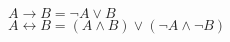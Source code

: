 \documentclass[preview]{standalone}
\begin{document}
\begin{center}
${A\rightarrow B=\neg A\vee B}$ \\ ${A\leftrightarrow B=(A\wedge B)\vee (\neg A\wedge \neg B)}$
\end{center}
\end{document}
